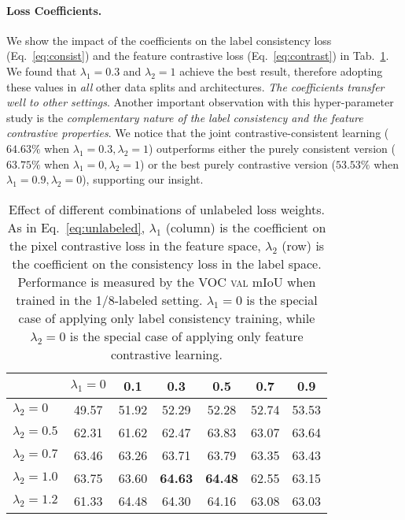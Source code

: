\paragraph{Loss Coefficients.}
We show the impact of the coefficients on the label consistency loss (Eq.~\ref{eq:consist}) and the feature contrastive loss (Eq.~\ref{eq:contrast}) in Tab.~\ref{tab:abl/coef}. We found that $\lambda_1=0.3$ and $\lambda_2=1$ achieve the best result, therefore adopting these values in \emph{all} other data splits and architectures. {\em The coefficients transfer well to other settings}.
Another important observation with this hyper-parameter study is the {\em complementary nature of the label consistency and the feature contrastive properties}. We notice that the joint contrastive-consistent learning ($64.63\%$ when $\lambda_1=0.3, \lambda_2=1$) outperforms either the purely consistent version ($63.75\%$ when $\lambda_1=0, \lambda_2=1$) or the best purely contrastive version ($53.53\%$ when $\lambda_1=0.9, \lambda_2=0$), supporting our insight.

\begin{table}[tb]
    \footnotesize
    \centering
    \caption{Effect of different combinations of unlabeled loss weights. As in Eq.~\ref{eq:unlabeled}, $\lambda_1$ (column) is the coefficient on the pixel contrastive loss in the feature space, $\lambda_2$ (row) is the coefficient on the consistency loss in the label space. Performance is measured by the VOC \textsc{val} mIoU when trained in the 1/8-labeled setting. $\lambda_1=0$ is the special case of applying only label consistency training, while $\lambda_2=0$ is the special case of applying only feature contrastive learning.}
    \label{tab:abl/coef}
    \setlength{\tabcolsep}{6.5pt}
    \begin{tabular}{lcccccc}
    \toprule
      & $\lambda_1=0$ & 0.1 & 0.3 & 0.5 & 0.7 & 0.9  \\
    \midrule
    $\lambda_2=0$ & 49.57 & 51.92 & 52.29 & 52.28 & 52.74 & 53.53 \\
    $\lambda_2=0.5$ & 62.31 & 61.62 & 62.47 & 63.83 & 63.07 & 63.64 \\
    $\lambda_2=0.7$ & 63.46 & 63.26 & 63.71 & 63.79 & 63.35 & 63.43 \\
    $\lambda_2=1.0$ & 63.75 & 63.60 & \textbf{64.63} & \textbf{64.48} & 62.55 & 63.15 \\
    $\lambda_2=1.2$ & 61.33 & 64.48 & 64.30 & 64.16 & 63.08 & 63.03 \\
    \bottomrule
    \end{tabular}
    \vspace{-5pt}
\end{table}


